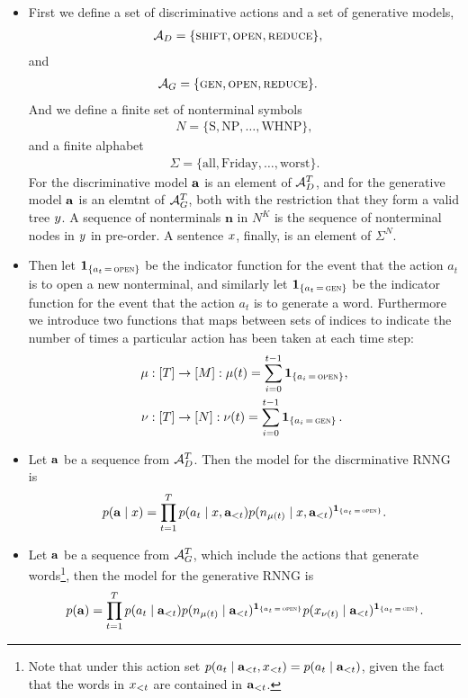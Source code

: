 \begin{itemize}
  \item First we define a set of discriminative actions and a set of generative models,
  \begin{align}
    \mathcal{A}_D &= \{ \textsc{shift}, \textsc{open}, \textsc{reduce} \},
  \end{align}
  and
  \begin{align}
    \mathcal{A}_G &= \{ \textsc{gen}, \textsc{open}, \textsc{reduce} \}.
  \end{align}
  And we define a finite set of nonterminal symbols
  \begin{align*}
    N = \{ \text{S}, \text{NP}, \dots, \text{WHNP}\},
  \end{align*}
  and a finite alphabet
  \begin{align*}
    \Sigma = \{ \text{all}, \text{Friday}, \dots, \text{worst} \}.
  \end{align*}
  For the discriminative model $\mathbf{a}$ is an element of $\mathcal{A}_D^T$, and for the generative model $\mathbf{a}$ is an elemtnt of $\mathcal{A}_G^T$, both with the restriction that they form a valid tree $y$. A sequence of nonterminals $\mathbf{n}$ in $N^K$ is the sequence of nonterminal nodes in $y$ in pre-order. A sentence $x$, finally, is an element of $\Sigma^N$.

  \item Then let $\operatorname{\mathbf{1}}_{ \{ a_t \, = \, \textsc{open} \} }$ be the indicator function for the event that the action $a_t$ is to open a new nonterminal, and similarly let $\operatorname{\mathbf{1}}_{ \{ a_t \, = \, \textsc{gen} \} }$ be the indicator function for the event that the action $a_t$ is to generate a word. Furthermore we introduce two functions that maps between sets of indices to indicate the number of times a particular action has been taken at each time step:
  \begin{align*}
    \mu &: [ T ] \to [ M ]: \mu(t) = \sum_{i=0}^{t-1} \operatorname{\mathbf{1}}_{ \{ a_i \, = \, \textsc{open} \} },  \\
    \nu &: [ T ] \to [ N ]: \nu(t) = \sum_{i=0}^{t-1} \operatorname{\mathbf{1}}_{ \{ a_i \, = \, \textsc{gen} \} }.
  \end{align*}

  \item Let $\mathbf{a}$ be a sequence from $\mathcal{A}_D^T$. Then the model for the discrminative RNNG is
  \begin{align}
    \label{eq:disc-model}
    p(\mathbf{a} \mid x) = \prod_{t=1}^T p(a_t \mid x, \mathbf{a}_{<t}) p(n_{\mu(t)} \mid x, \mathbf{a}_{<t} )^{ \operatorname{\mathbf{1}}_{ \{ a_t \, = \, \textsc{open} \} } }.
  \end{align}
  \item Let $\mathbf{a}$ be a sequence from $\mathcal{A}_G^T$, which include the actions that generate words\footnote{Note that under this action set $p(a_t \mid \mathbf{a}_{<t}, x_{<t}) = p(a_t \mid \mathbf{a}_{<t})$, given the fact that the words in $x_{<t}$ are contained in $\mathbf{a}_{<t}$.}, then the model for the generative RNNG is
  \begin{align}
    \label{eq:gen-model}
    p(\mathbf{a}) = \prod_{t=1}^T p(a_t \mid \mathbf{a}_{<t}) p(n_{\mu(t)} \mid   \mathbf{a}_{<t})^{ \operatorname{\mathbf{1}}_{ \{ a_t \, = \, \textsc{open} \} } } p(x_{\nu(t)} \mid \mathbf{a}_{<t})^{ \operatorname{\mathbf{1}}_{ \{ a_t \, = \, \textsc{gen} \} } }.
  \end{align}


\end{itemize}
